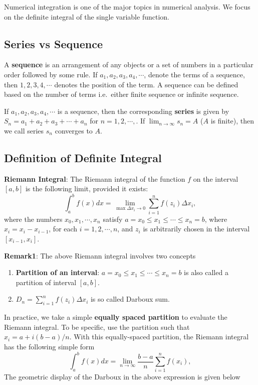 \documentclass[
]{book}
\begin{document}
Numerical integration is one of the major topics in numerical analysis. We focus on the definite integral of the single variable function.

\hypertarget{series-vs-sequence}{%
\subsection{Series vs Sequence}\label{series-vs-sequence}}

A \textbf{sequence} is an arrangement of any objects or a set of numbers in a particular order followed by some rule. If \(a_1, a_2, a_3, a_4,\cdots\), denote the terms of a sequence, then \(1,2,3,4, \cdots\) denotes the position of the term. A sequence can be defined based on the number of terms i.e.~either finite sequence or infinite sequence.

If \(a_1, a_2, a_3, a_4,\cdots\) is a sequence, then the corresponding \textbf{series} is given by \(S_n = a_1+a_2+a_3 + \cdots + a_n\) for \(n = 1, 2, \cdots,\). If \(\lim_{n \to \infty} s_n = A\) (\(A\) is finite), then we call series \(s_n\) converges to \(A\).

\hypertarget{definition-of-definite-integral}{%
\subsection{Definition of Definite Integral}\label{definition-of-definite-integral}}

\textbf{Riemann Integral}: The Riemann integral of the function \(f\) on the interval \([a, b]\) is the following limit,
provided it exists:
\[
\int_a^bf(x) dx = \lim_{\max \Delta x_i \to 0} \sum_{i=1}^n f(z_i)\Delta x_i, 
\]
where the numbers \(x_0, x_1, \cdots , x_n\) satisfy \(a = x_0 \le x_1 \le \cdots \le x_n = b\), where \(x_i = x_i - x_{i-1}\), for each \(i = 1, 2, \cdots, n\), and \(z_i\) is arbitrarily chosen in the interval \([x_{i-1}, x_i]\).

\textbf{Remark1}: The above Riemann integral involves two concepts

\begin{enumerate}
\def\labelenumi{\arabic{enumi}.}
\item
  \textbf{Partition of an interval}: \(a = x_0 \le x_1 \le \cdots \le x_n = b\) is also called a partition of interval \([a,b]\).
\item
  \(D_n = \sum_{i=1}^n f(z_i)\Delta x_i\) is so called Darboux sum.
\end{enumerate}

In practice, we take a simple \textbf{equally spaced partition} to evaluate the Riemann integral. To be specific, use the partition such that \(x_i = a + i(b-a)/n\). With this equally-spaced partition, the Riemann integral has the following simple form
\[
\int_a^b f(x) dx = \lim_{n \to \infty}\frac{b-a}{n}\sum_{i=1}^nf(x_i),
\]
The geometric display of the Darboux in the above expression is given below
\end{document}
